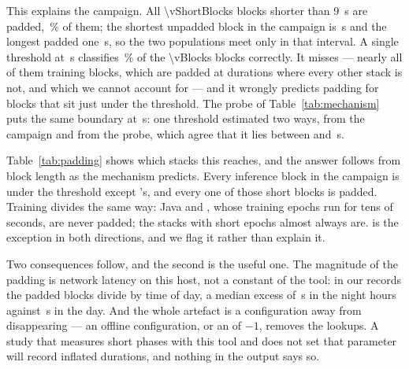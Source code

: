 This explains the campaign. All \num{\vShortBlocks} blocks shorter than
\SI{9}{\second} are padded, \vShortBlocksPaddedPct\,\% of them; the shortest
unpadded block in the campaign is \vPaddedShortestUnpaddedS\,\si{\second} and
the longest padded one \vPaddedLongestPaddedS\,\si{\second}, so the two
populations meet only in that interval. A single threshold at
\vWindowThresholdS\,\si{\second} classifies \vThresholdAccuracyPct\,\% of the
\num{\vBlocks} blocks correctly. It misses \vThresholdMisses{} --- nearly all of
them \vThresholdMissEco{} training blocks, which are padded at durations where
every other stack is not, and which we cannot account for --- and it wrongly
predicts padding for \vThresholdFalsePos{} blocks that sit just under the
threshold. The probe of Table~\ref{tab:mechanism} puts the same boundary at
\vMechThresholdS\,\si{\second}: one threshold estimated two ways, from the
campaign and from the probe, which agree that it lies between
\vMechThresholdLowS{} and \vMechThresholdS\,\si{\second}.

Table~\ref{tab:padding} shows which stacks this reaches, and the answer follows
from block length as the mechanism predicts. Every inference block in the
campaign is under the threshold except \vWindowUnpaddedEco{}'s, and every one of
those short blocks is padded. Training divides the same way: Java and
\vWindowUnpaddedEco{}, whose training epochs run for tens of seconds, are never
padded; the stacks with short epochs almost always are.
\vWindowAlwaysPaddedEco{} is the exception in both directions, and we flag it
rather than explain it.

\begin{table}[t]
\centering
\caption{Where the reported window is padded, by stack and phase, with the
range of block lengths each stack produces. The pattern follows the threshold
of Table~\ref{tab:mechanism}; \vWindowAlwaysPaddedEco{} training does not.}
\label{tab:padding}
{\footnotesize\setlength{\tabcolsep}{3pt}}
\end{table}

Two consequences follow, and the second is the useful one. The magnitude of the
padding is network latency on this host, not a constant of the tool: in our
records the padded blocks divide by time of day, a median excess of
\vWindowNightMedianS\,\si{\second} in the night hours against
\vWindowDayMedianS\,\si{\second} in the day. And the
whole artefact is a configuration away from disappearing --- an offline
configuration, or an  of $-1$, removes the lookups.
A study that measures short phases with this tool and does not set that
parameter will record inflated durations, and nothing in the output says so.

